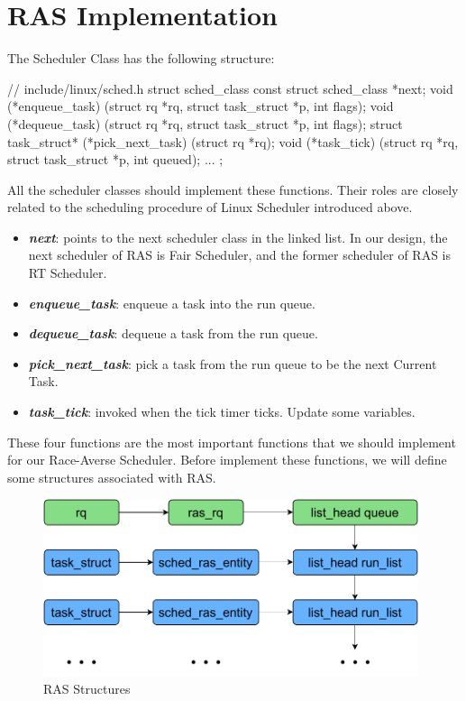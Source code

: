 \section{RAS Implementation}

The Scheduler Class has the following structure:

\begin{codeblock}[language=C]
// include/linux/sched.h
struct sched_class {
	const struct sched_class *next;
	void (*enqueue_task) (struct rq *rq, struct task_struct *p, int flags);
	void (*dequeue_task) (struct rq *rq, struct task_struct *p, int flags);
	struct task_struct* (*pick_next_task) (struct rq *rq);
	void (*task_tick) (struct rq *rq, struct task_struct *p, int queued);
	...
};
\end{codeblock}

All the scheduler classes should implement these functions. Their roles are closely related to the scheduling procedure of Linux Scheduler introduced above.

\begin{itemize}
    \item \textbf{\textit{next}}: points to the next scheduler class in the linked list. In our design, the next scheduler of RAS is Fair Scheduler, and the former scheduler of RAS is RT Scheduler.
    \item \textbf{\textit{enqueue\_task}}: enqueue a task into the run queue. 
    \item \textbf{\textit{dequeue\_task}}: dequeue a task from the run queue.
    \item \textbf{\textit{pick\_next\_task}}: pick a task from the run queue to be the next Current Task.
    \item \textbf{\textit{task\_tick}}: invoked when the tick timer ticks. Update some variables.
\end{itemize}

These four functions are the most important functions that we should implement for our Race-Averse Scheduler. Before implement these functions, we will define some structures associated with RAS.

\begin{figure}[!htp]
  \centering
  \includegraphics[width=11cm]{figures/structures.drawio.pdf}
  \caption{RAS Structures}
\end{figure}

